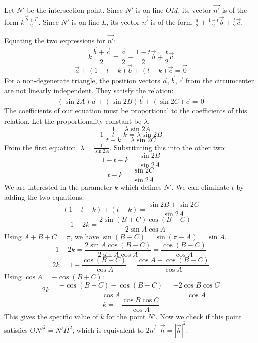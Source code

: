 Let $N'$ be the intersection point.
Since $N'$ is on line $OM$, its vector $\vec{n'}$ is of the form $k\frac{\vec{b}+\vec{c}}{2}$.
Since $N'$ is on line $L$, its vector $\vec{n'}$ is of the form $\frac{\vec{a}}{2} + \frac{1-t}{2}\vec{b} + \frac{t}{2}\vec{c}$.

Equating the two expressions for $\vec{n'}$:
$$ k\frac{\vec{b}+\vec{c}}{2} = \frac{\vec{a}}{2} + \frac{1-t}{2}\vec{b} + \frac{t}{2}\vec{c} $$
$$ \vec{a} + (1-t-k)\vec{b} + (t-k)\vec{c} = \vec{0} $$
For a non-degenerate triangle, the position vectors $\vec{a}, \vec{b}, \vec{c}$ from the circumcenter are not linearly independent. They satisfy the relation:
$$ (\sin 2A)\vec{a} + (\sin 2B)\vec{b} + (\sin 2C)\vec{c} = \vec{0} $$
The coefficients of our equation must be proportional to the coefficients of this relation. Let the proportionality constant be $\lambda$.
$$ 1 = \lambda \sin 2A $$
$$ 1-t-k = \lambda \sin 2B $$
$$ t-k = \lambda \sin 2C $$
From the first equation, $\lambda = \frac{1}{\sin 2A}$. Substituting this into the other two:
$$ 1-t-k = \frac{\sin 2B}{\sin 2A} $$
$$ t-k = \frac{\sin 2C}{\sin 2A} $$
We are interested in the parameter $k$ which defines $N'$. We can eliminate $t$ by adding the two equations:
$$ (1-t-k) + (t-k) = \frac{\sin 2B + \sin 2C}{\sin 2A} $$
$$ 1-2k = \frac{2\sin(B+C)\cos(B-C)}{2\sin A \cos A} $$
Using $A+B+C=\pi$, we have $\sin(B+C) = \sin(\pi-A) = \sin A$.
$$ 1-2k = \frac{2\sin A \cos(B-C)}{2\sin A \cos A} = \frac{\cos(B-C)}{\cos A} $$
$$ 2k = 1 - \frac{\cos(B-C)}{\cos A} = \frac{\cos A - \cos(B-C)}{\cos A} $$
Using $\cos A = -\cos(B+C)$:
$$ 2k = \frac{-\cos(B+C) - \cos(B-C)}{\cos A} = \frac{-2\cos B \cos C}{\cos A} $$
$$ k = -\frac{\cos B \cos C}{\cos A} $$
This gives the specific value of $k$ for the point $N'$. Now we check if this point satisfies $ON'^2=N'H^2$, which is equivalent to $2\vec{n'}\cdot\vec{h} = |\vec{h}|^2$.

